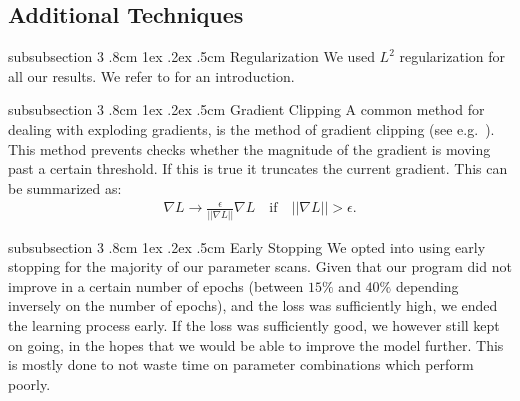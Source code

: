 \documentclass[%
reprint,
amsmath,amssymb,
aps,
]{revtex4-2}
\makeatletter
\renewcommand{\subsubsection}{%
	\@startsection
	{subsubsection}%
	{3}%
	{\z@}%
	{.8cm \@plus1ex \@minus .2ex}%
	{.5cm}%
	{\normalfont\small\centering}%
}
\makeatother
\begin{document}
\subsection{Additional Techniques}
\subsubsection{Regularization}
We used $L^2$ regularization for all our results. We refer to \cite{project1} for an introduction.

\subsubsection{Gradient Clipping}
A common method for dealing with exploding gradients, is the method of gradient clipping (see e.g.~\cite{Goodfellow-et-al-2016}). This method prevents checks whether the magnitude of the gradient is moving past a certain threshold. If this is true it truncates the current gradient. This can be summarized as:
\begin{align}	\label{eq:clipping}
	\nabla L \rightarrow \frac{\epsilon}{||\nabla L||}\nabla L\quad\text{if}\quad||\nabla L|| > \epsilon.
\end{align}

\subsubsection{Early Stopping}
We opted into using early stopping for the majority of our parameter scans. Given that our program did not improve in a certain number of epochs (between $15\%$ and $40\%$ depending inversely on the number of epochs), and the loss was sufficiently high, we ended the learning process early. If the loss was sufficiently good, we however still kept on going, in the hopes that we would be able to improve the model further. This is mostly done to not waste time on parameter combinations which perform poorly. 
\end{document}
